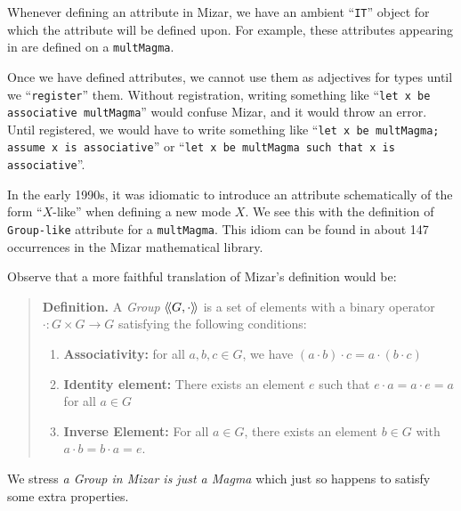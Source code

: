 \begin{idiom}\label{rmk:introduction:idiom-it-in-attributes}
Whenever defining an attribute in Mizar, we have an ambient
``\lstinline{IT}'' object for which the attribute will be defined upon. For
example, these attributes appearing in  are defined
on a \lstinline{multMagma}.
\end{idiom}

\begin{remark}
Once we have defined attributes, we cannot use them as adjectives for
types until we ``\lstinline{register}'' them. Without registration, writing
something like ``\lstinline{let x be associative multMagma}'' would confuse
Mizar, and it would throw an error. Until registered, we would have to
write something like ``\lstinline{let x be multMagma; assume x is associative}''
or ``\lstinline{let x be multMagma such that x is associative}''.
\end{remark}

\begin{idiom}
In the early 1990s, it was idiomatic to introduce an attribute
schematically of the form ``$X$-like'' when defining a new mode $X$. We
see this with the definition of \lstinline{Group-like} attribute for a
\lstinline{multMagma}. This idiom can be found in about 147 occurrences
in the Mizar mathematical library.
\end{idiom}

Observe that a more faithful translation of Mizar's definition would
be:

\begin{quote}
  \textbf{Definition.} A \emph{Group} $\struct{G,\cdot}$ is a set of
  elements with a binary operator $\cdot\colon G\times G\to G$
  satisfying the following conditions:
  \begin{enumerate}
  \item \textbf{Associativity:} for all $a,b,c\in G$, we have $(a\cdot b)\cdot c = a\cdot(b\cdot c)$
  \item \textbf{Identity element:} There exists an element $e$ such that
    $e\cdot a= a\cdot e = a$ for all $a\in G$
  \item \textbf{Inverse Element:} For all $a\in G$, there exists an
    element $b\in G$ with $a\cdot b=b\cdot a = e$.
  \end{enumerate}
\end{quote}
We stress \emph{a Group in Mizar is just a Magma} which just so happens
to satisfy some extra properties.

